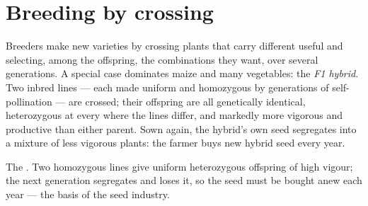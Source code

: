 \section{Breeding by crossing}

\begin{proposition}\label{prop:g12:domesticated-plants:hybrids}
Breeders make new varieties by crossing plants that carry different
useful  and selecting, among the offspring, the combinations
they want, over several generations. A special case dominates maize
and many vegetables: the \emph{F1 hybrid}. Two
inbred lines --- each made uniform and homozygous by generations of
self-pollination --- are crossed; their offspring are all genetically
identical, heterozygous at every  where the lines differ, and
markedly more vigorous and productive than either parent. Sown again,
the hybrid's own seed segregates into a mixture of less vigorous
plants: the farmer buys new hybrid seed every year.
\end{proposition}
\admitted

\begin{omfigure}

{\small The . Two homozygous lines give uniform heterozygous
offspring of high vigour; the next generation segregates and loses it,
so the seed must be bought anew each year --- the basis of the seed
industry.}
\end{omfigure}

